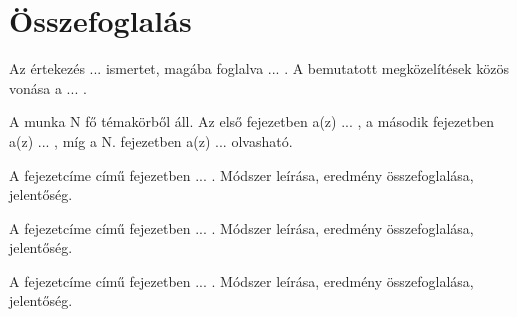 \documentclass[12pt,a4paper]{extarticle}
\begin{document}
\newpage

\section{Összefoglalás}

Az értekezés ... ismertet, magába foglalva ... . A bemutatott megközelítések közös vonása a ... .

A munka N fő témakörből áll. Az első fejezetben a(z) ... , a második fejezetben a(z) ... , míg a N. fejezetben a(z) ... olvasható.

A fejezetcíme című fejezetben ... . Módszer leírása, eredmény összefoglalása, jelentőség.

A fejezetcíme című fejezetben ... . Módszer leírása, eredmény összefoglalása, jelentőség.

A fejezetcíme című fejezetben ... . Módszer leírása, eredmény összefoglalása, jelentőség.


\newpage



\newpage
\thispagestyle{empty}
\mbox{}
\newpage
\end{document}
